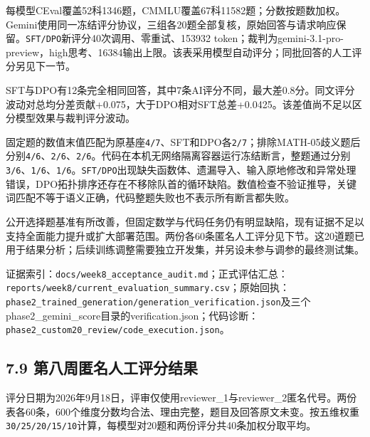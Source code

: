 \documentclass[UTF8,fontset=fandol,a4paper,11pt]{ctexart}
\begin{document}
{每模型CEval覆盖52科1346题，CMMLU覆盖67科11582题；分数按题数加权。Gemini使用同一冻结评分协议，三组各20题全部复核，原始回答与请求响应保留。\nolinkurl{SFT/DPO}新评分40次调用、零重试、153932}
token；裁判为gemini-3.1-pro-preview，high思考、16384输出上限。该表采用模型自动评分；同批回答的人工评分另见下一节。

SFT与DPO有12条完全相同回答，其中7条AI评分不同，最大差0.8分。同文评分波动对总均分差贡献+0.075，大于DPO相对SFT总差+0.0425。该差值尚不足以区分模型效果与裁判评分波动。

{固定题的数值末值匹配为原基座\nolinkurl{4/7}、SFT和DPO各\nolinkurl{2/7}；排除MATH-05歧义题后分别\nolinkurl{4/6}、\nolinkurl{2/6}、\nolinkurl{2/6}。代码在本机无网络隔离容器运行冻结断言，整题通过分别\nolinkurl{3/6}、\nolinkurl{1/6}、\nolinkurl{1/6}。\nolinkurl{SFT/DPO}出现缺失函数体、遗漏导入、输入原地修改和异常处理错误，DPO拓扑排序还存在不移除队首的循环缺陷。数值检查不验证推导，关键词匹配不等于语义正确，代码整题失败也不表示所有断言都失败。}

公开选择题基准有所改善，但固定数学与代码任务仍有明显缺陷，现有证据不足以支持全面能力提升或扩大部署范围。两份各60条匿名人工评分见下节。这20道题已用于结果分析；后续训练调整需要独立开发集，并另设未参与调参的最终测试集。

{证据索引：\nolinkurl{docs/week8_acceptance_audit.md}；正式评估汇总：\nolinkurl{reports/week8/current_evaluation_summary.csv}；原始回执：\nolinkurl{phase2_trained_generation/generation_verification.json}及三个phase2\_gemini\_score目录的verification.json；代码诊断：\nolinkurl{phase2_custom20_review/code_execution.json}。}

\subsection{7.9 第八周匿名人工评分结果}\label{ux7b2cux516bux5468ux533fux540dux4ebaux5de5ux8bc4ux5206ux7ed3ux679c}

{评分日期为2026年9月18日，评审仅使用reviewer\_1与reviewer\_2匿名代号。两份表各60条，600个维度分数均合法、理由完整，题目及回答原文未变。按五维权重\nolinkurl{30/25/20/15/10}计算，每模型对20题和两份评分共40条加权分取平均。}

\Needspace{115pt}
\end{document}

